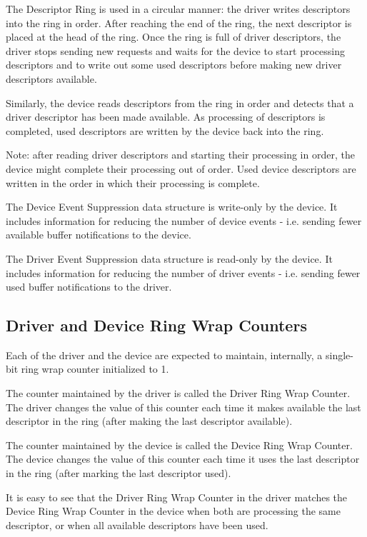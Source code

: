 The Descriptor Ring is used in a circular manner: the driver writes
descriptors into the ring in order. After reaching the end of the ring,
the next descriptor is placed at the head of the ring.  Once the ring is
full of driver descriptors, the driver stops sending new requests and
waits for the device to start processing descriptors and to write out
some used descriptors before making new driver descriptors
available.

Similarly, the device reads descriptors from the ring in order and
detects that a driver descriptor has been made available.  As
processing of descriptors is completed, used descriptors are
written by the device back into the ring.

Note: after reading driver descriptors and starting their
processing in order, the device might complete their processing out
of order.  Used device descriptors are written in the order
in which their processing is complete.

The Device Event Suppression data structure is write-only by the
device. It includes information for reducing the number of
device events - i.e. sending fewer available buffer notifications
to the device.

The Driver Event Suppression data structure is read-only by the
device. It includes information for reducing the number of
driver events - i.e. sending fewer used buffer notifications 
to the driver.

\subsection{Driver and Device Ring Wrap Counters}
\label{sec:Packed Virtqueues / Driver and Device Ring Wrap Counters}
Each of the driver and the device are expected to maintain,
internally, a single-bit ring wrap counter initialized to 1.

The counter maintained by the driver is called the Driver
Ring Wrap Counter. The driver changes the value of this counter
each time it makes available the
last descriptor in the ring (after making the last descriptor
available).

The counter maintained by the device is called the Device Ring Wrap
Counter.  The device changes the value of this counter
each time it uses the last descriptor in
the ring (after marking the last descriptor used).

It is easy to see that the Driver Ring Wrap Counter in the driver matches
the Device Ring Wrap Counter in the device when both are processing the same
descriptor, or when all available descriptors have been used.

